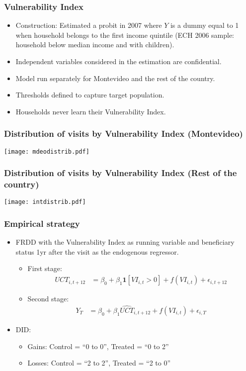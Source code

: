 \documentclass{beamer}
\begin{document}
\begin{frame}
\frametitle{Vulnerability Index}
\begin{itemize}
\item Construction: Estimated a probit in 2007 where $Y$ is a dummy equal to 1 when household belongs to the first income quintile (ECH 2006 sample: household below median income and with children).
\item Independent variables considered in the estimation are confidential.
\item Model run separately for Montevideo and the rest of the country.
\item Thresholds defined to capture target population.
\item Households never learn their Vulnerability Index.	
\end{itemize}
\end{frame}

\begin{frame}
\frametitle{Distribution of visits by Vulnerability Index (Montevideo)}
\begin{center}
	\texttt{[image: mdeodistrib.pdf]}
	\label{mdeodistrib}
\end{center}
\end{frame}

\begin{frame}
\frametitle{Distribution of visits by Vulnerability Index (Rest of the country)}
\begin{center}
	\texttt{[image: intdistrib.pdf]}
	\label{intdistrib}
\end{center}
\end{frame}

\begin{frame}
\frametitle{Empirical strategy}
\begin{itemize}
	\item FRDD with the Vulnerability Index as running variable and beneficiary status 1yr after the visit as the endogenous regressor.
	\begin{itemize}
		\item First stage:	
		\begin{align*}
		UCT_{i,t+12} & = \beta _0 + \beta_1\mathbf{1}[VI_{i,t}>0] + f(VI_{i,t}) + \epsilon_{i,t+12}
		\end{align*}
		\item Second stage:	
		\begin{align*}
		Y_{T} & = \beta _0 + \beta_1\hat{UCT}_{i,t+12} + f(VI_{i,t}) + \epsilon_{i,T}
		\end{align*}
	\end{itemize}
	\item DID:
	\begin{itemize}
		\item Gains: Control = ``0 to 0'', Treated = ``0 to 2''
		\item Losses: Control = ``2 to 2'', Treated = ``2 to 0''
	\end{itemize}
\end{itemize}
\end{frame}
\end{document}
